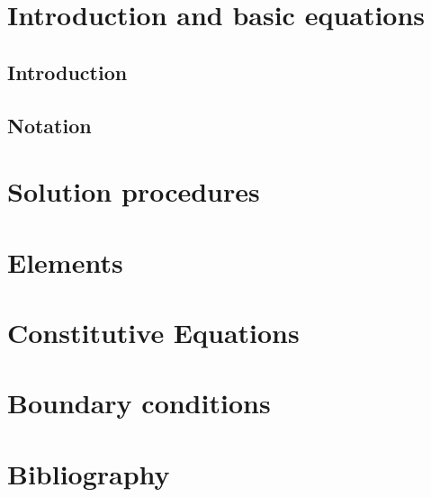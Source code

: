 \documentclass[a4paper]{book}
\begin{document}


\clearpage
\setcounter{page}{1}
\pagestyle{headings}

\tableofcontents
%
\chapter{Introduction and basic equations}
\section{Introduction}
\section{Notation}

\chapter{Solution procedures}

\chapter{Elements}
\chapter{Constitutive Equations}
\chapter{Boundary conditions}

\chapter{Bibliography}


\end{document}
